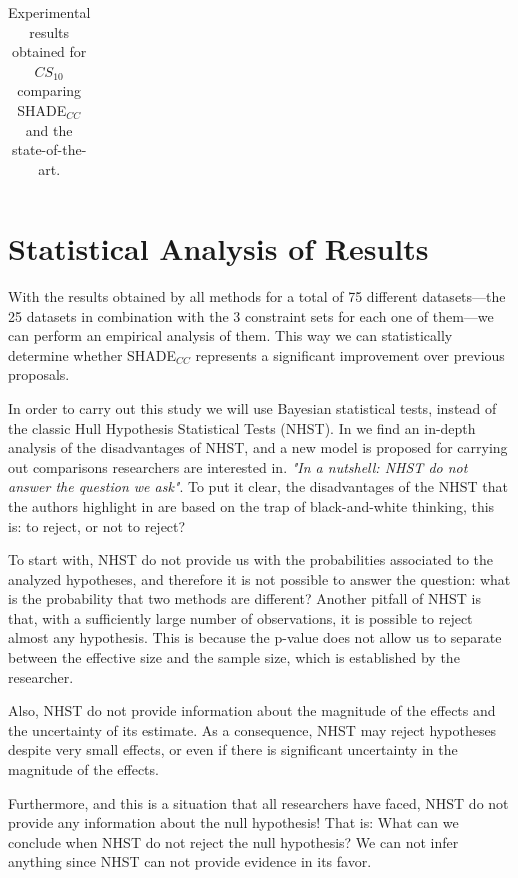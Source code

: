 \documentclass[review]{elsarticle}
\begin{document}
\begin{table}[!h]
{\begin{tabular}{lccccccc}
		\end{tabular}}
		
		\caption{Experimental results obtained for $CS_{10}$ comparing SHADE$_{CC}$ and the state-of-the-art.}
		\label{tab:results25SOTA}
	\end{table}
	
	
\clearpage

\section{Statistical Analysis of Results} \label{sec:analisis}

With the results obtained by all methods for a total of 75 different datasets---the 25 datasets in combination with the 3 constraint sets for each one of them---we can perform an empirical analysis of them. This way we can statistically determine whether SHADE$_{CC}$ represents a significant improvement over previous proposals.

In order to carry out this study we will use Bayesian statistical tests, instead of the classic Hull Hypothesis Statistical Tests (NHST). In \cite{benavoli2017time} we find an in-depth analysis of the disadvantages of NHST, and a new model is proposed for carrying out comparisons researchers are interested in. \textit{"In a nutshell: NHST do not answer the question we ask"}. To put it clear, the disadvantages of the NHST that the authors highlight in \cite{benavoli2017time} are based on the trap of black-and-white thinking, this is: to reject, or not to reject?

To start with, NHST do not provide us with the probabilities associated to the analyzed hypotheses, and therefore it is not possible to answer the question: what is the probability that two methods are different? Another pitfall of NHST is that, with a sufficiently large number of observations, it is possible to reject almost any hypothesis. This is because the p-value does not allow us to separate between the effective size and the sample size, which is established by the researcher.

Also, NHST do not provide information about the magnitude of the effects and the uncertainty of its estimate. As a consequence, NHST may reject hypotheses despite very small effects, or even if there is significant uncertainty in the magnitude of the effects.

Furthermore, and this is a situation that all researchers have faced, NHST do not provide any information about the null hypothesis! That is: What can we conclude when NHST do not reject the null hypothesis? We can not infer anything since NHST can not provide evidence in its favor.
\end{document}
